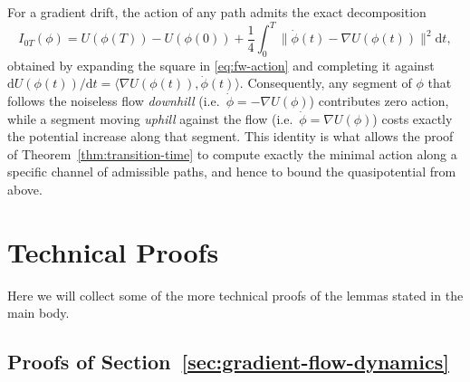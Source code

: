 \documentclass{article}
\newcommand{\dd}{\mathrm d}
\theoremstyle{plain}
\theoremstyle{definition}
\theoremstyle{remark}
\begin{document}
For a gradient drift, the action of any path admits the exact decomposition
\begin{equation}
    I_{0T}(\phi) = U(\phi(T))-U(\phi(0)) + \frac14\int_0^T\bigl\|\dot\phi(t)-\nabla U(\phi(t))\bigr\|^2\dd t,
    \label{eq:gradient-decomposition}
\end{equation}
obtained by expanding the square in \eqref{eq:fw-action} and completing it against $\dd U(\phi(t))/\dd t = \langle\nabla U(\phi(t)),\dot\phi(t)\rangle$. Consequently, any segment of $\phi$ that follows the noiseless flow \emph{downhill} (i.e.\ $\dot\phi=-\nabla U(\phi)$) contributes zero action, while a segment moving \emph{uphill} against the flow (i.e.\ $\dot\phi=\nabla U(\phi)$) costs exactly the potential increase along that segment. This identity is what allows the proof of Theorem~\ref{thm:transition-time} to compute exactly the minimal action along a specific channel of admissible paths, and hence to bound the quasipotential from above.

\section{Technical Proofs}
\label{apx:technical-proofs}

Here we will collect some of the more technical proofs of the lemmas stated in the main body.

\subsection{Proofs of Section~\ref{sec:gradient-flow-dynamics}}
\end{document}
